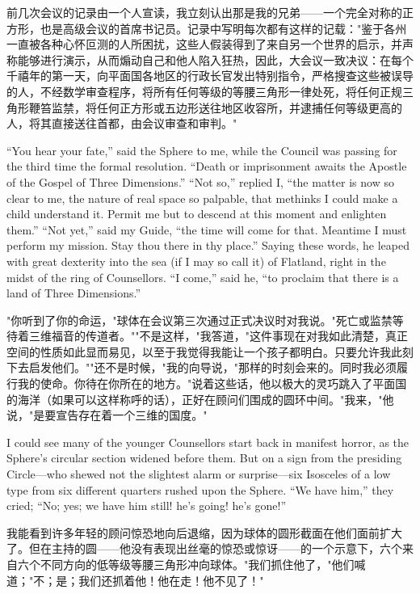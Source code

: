 \documentclass[12pt,UTF8]{ctexbook}
\begin{document}
前几次会议的记录由一个人宣读，我立刻认出那是我的兄弟——一个完全对称的正方形，也是高级会议的首席书记员。记录中写明每次都有这样的记载："鉴于各州一直被各种心怀叵测的人所困扰，这些人假装得到了来自另一个世界的启示，并声称能够进行演示，从而煽动自己和他人陷入狂热，因此，大会议一致决议：在每个千禧年的第一天，向平面国各地区的行政长官发出特别指令，严格搜查这些被误导的人，不经数学审查程序，将所有任何等级的等腰三角形一律处死，将任何正规三角形鞭笞监禁，将任何正方形或五边形送往地区收容所，并逮捕任何等级更高的人，将其直接送往首都，由会议审查和审判。"

``You hear your fate,'' said the Sphere to me, while the Council was passing for the third time the formal resolution. ``Death or imprisonment awaits the Apostle of the Gospel of Three Dimensions.'' ``Not so,'' replied I, ``the matter is now so clear to me, the nature of real space so palpable, that methinks I could make a child understand it. Permit me but to descend at this moment and enlighten them.'' ``Not yet,'' said my Guide, ``the time will come for that. Meantime I must perform my mission. Stay thou there in thy place.'' Saying these words, he leaped with great dexterity into the sea (if I may so call it) of Flatland, right in the midst of the ring of Counsellors. ``I come,'' said he, ``to proclaim that there is a land of Three Dimensions.''

"你听到了你的命运，"球体在会议第三次通过正式决议时对我说。"死亡或监禁等待着三维福音的传道者。""不是这样，"我答道，"这件事现在对我如此清楚，真正空间的性质如此显而易见，以至于我觉得我能让一个孩子都明白。只要允许我此刻下去启发他们。""还不是时候，"我的向导说，"那样的时刻会来的。同时我必须履行我的使命。你待在你所在的地方。"说着这些话，他以极大的灵巧跳入了平面国的海洋（如果可以这样称呼的话），正好在顾问们围成的圆环中间。"我来，"他说，"是要宣告存在着一个三维的国度。"

I could see many of the younger Counsellors start back in manifest horror, as the Sphere's circular section widened before them. But on a sign from the presiding Circle---who shewed not the slightest alarm or surprise---six Isosceles of a low type from six different quarters rushed upon the Sphere. ``We have him,'' they cried; ``No; yes; we have him still! he's going! he's gone!''

我能看到许多年轻的顾问惊恐地向后退缩，因为球体的圆形截面在他们面前扩大了。但在主持的圆——他没有表现出丝毫的惊恐或惊讶——的一个示意下，六个来自六个不同方向的低等级等腰三角形冲向球体。"我们抓住他了，"他们喊道；"不；是；我们还抓着他！他在走！他不见了！"
\end{document}
